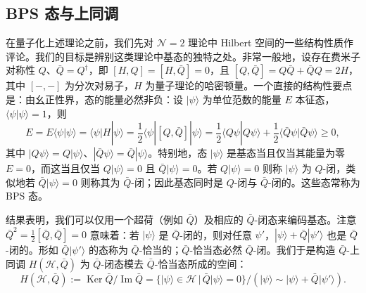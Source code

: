 \subsection{BPS 态与上同调}

在量子化上述理论之前，我们先对 $\mathcal{N}=2$ 理论中 Hilbert 空间的一些结构性质作评论。我们的目标是辨别这类理论中基态的独特之处。非常一般地，设存在费米子对称性 $Q$、$\bar Q=Q^\dagger$，即 $[H,Q]=[H,\bar Q]=0$，且 $[Q,\bar Q]=Q\bar Q+\bar Q Q=2H$，其中 $[-,-]$ 为分次对易子，$H$ 为量子理论的哈密顿量。一个直接的结构性要点是：由幺正性界，态的能量必然非负：设 $|\psi\rangle$ 为单位范数的能量 $E$ 本征态，$\langle\psi|\psi\rangle=1$，则
\begin{equation}\tag{B.12}
E = E\langle\psi|\psi\rangle = \langle\psi|H|\psi\rangle = \frac{1}{2}\langle\psi|[Q,\bar Q]|\psi\rangle = \frac{1}{2}\langle Q\psi|Q\psi\rangle + \frac{1}{2}\langle\bar Q\psi|\bar Q\psi\rangle \ge 0,
\end{equation}
其中 $|Q\psi\rangle=Q|\psi\rangle$、$|\bar Q\psi\rangle=\bar Q|\psi\rangle$。特别地，态 $|\psi\rangle$ 是基态当且仅当其能量为零 $E=0$，而这当且仅当 $Q|\psi\rangle=0$ 且 $\bar Q|\psi\rangle=0$。若 $Q|\psi\rangle=0$ 则称 $|\psi\rangle$ 为 $Q$-闭，类似地若 $\bar Q|\psi\rangle=0$ 则称其为 $\bar Q$-闭；因此基态同时是 $Q$-闭与 $\bar Q$-闭的。这些态常称为 BPS 态。

结果表明，我们可以仅用一个超荷（例如 $\bar Q$）及相应的 $\bar Q$-闭态来编码基态。注意 $\bar Q^2=\frac{1}{2}[\bar Q,\bar Q]=0$ 意味着：若 $|\psi\rangle$ 是 $\bar Q$-闭的，则对任意 $\psi'$，$|\psi\rangle+\bar Q|\psi'\rangle$ 也是 $\bar Q$-闭的。形如 $\bar Q|\psi'\rangle$ 的态称为 $\bar Q$-恰当的；$\bar Q$-恰当态必然 $\bar Q$-闭。我们于是构造 $\bar Q$-上同调 $H(\mathcal{H},\bar Q)$ 为 $\bar Q$-闭态模去 $\bar Q$-恰当态所成的空间：
\begin{equation}\tag{B.13}
H(\mathcal{H},\bar Q) := \operatorname{Ker}\bar Q/\operatorname{Im}\bar Q = \{|\psi\rangle\in\mathcal{H}\,|\,\bar Q|\psi\rangle=0\}/\left(|\psi\rangle\sim|\psi\rangle+\bar Q|\psi'\rangle\right).
\end{equation}
